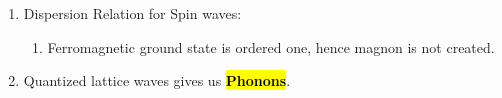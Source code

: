\begin{enumerate}
\begin{enumerate}[(i.)]
        \item Each magnon will reduce total spin by 1 $\mathrm{\hbar}$ and magnetization is reduced by $\mathrm{\gamma\hbar}$, where $\mathrm{\gamma}$ is the gyromagnetic ratio\footnote{Ratio of magnetic moment to the angular momentum.}.
        \item Experimentally detected in 1957 by Bertram Brockhouse by inelastic neutron scattering in ferrite.
        \item Detected in Ferro-, Ferri-, and Anti-ferromagnets.
    \end{enumerate}
    \item Dispersion Relation for Spin waves:
    \begin{enumerate}[(i.)]
        \item Ferromagnetic ground state is ordered one, hence magnon is not created. 
    \end{enumerate}
    \item Quantized lattice waves gives us \hl{\textbf{Phonons}}.     
\end{enumerate}